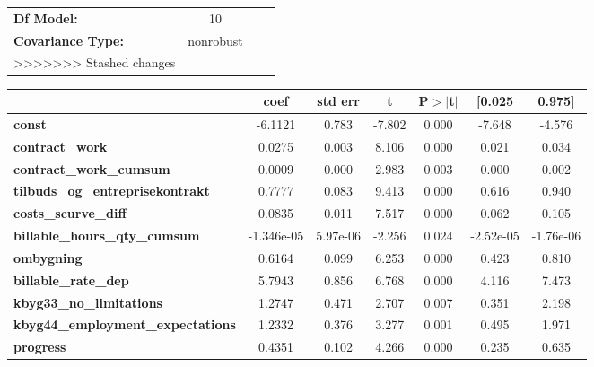 \begin{center}
\begin{tabular}{lclc}
\textbf{Df Model:}                       &            10       & \textbf{                     } &             \\
\textbf{Covariance Type:}                &      nonrobust      & \textbf{                     } &             \\
>>>>>>> Stashed changes
\bottomrule
\end{tabular}
\begin{tabular}{lcccccc}
                                          & \textbf{coef} & \textbf{std err} & \textbf{t} & \textbf{P$> |$t$|$} & \textbf{[0.025} & \textbf{0.975]}  \\
\midrule
\textbf{const}                            &      -6.1121  &        0.783     &    -7.802  &         0.000        &       -7.648    &       -4.576     \\
\textbf{contract\_work}                   &       0.0275  &        0.003     &     8.106  &         0.000        &        0.021    &        0.034     \\
\textbf{contract\_work\_cumsum}           &       0.0009  &        0.000     &     2.983  &         0.003        &        0.000    &        0.002     \\
\textbf{tilbuds\_og\_entreprisekontrakt}  &       0.7777  &        0.083     &     9.413  &         0.000        &        0.616    &        0.940     \\
\textbf{costs\_scurve\_diff}              &       0.0835  &        0.011     &     7.517  &         0.000        &        0.062    &        0.105     \\
\textbf{billable\_hours\_qty\_cumsum}     &   -1.346e-05  &     5.97e-06     &    -2.256  &         0.024        &    -2.52e-05    &    -1.76e-06     \\
\textbf{ombygning}                        &       0.6164  &        0.099     &     6.253  &         0.000        &        0.423    &        0.810     \\
\textbf{billable\_rate\_dep}              &       5.7943  &        0.856     &     6.768  &         0.000        &        4.116    &        7.473     \\
\textbf{kbyg33\_no\_limitations}          &       1.2747  &        0.471     &     2.707  &         0.007        &        0.351    &        2.198     \\
\textbf{kbyg44\_employment\_expectations} &       1.2332  &        0.376     &     3.277  &         0.001        &        0.495    &        1.971     \\
\textbf{progress}                         &       0.4351  &        0.102     &     4.266  &         0.000        &        0.235    &        0.635     \\

\end{tabular}
\end{center}
